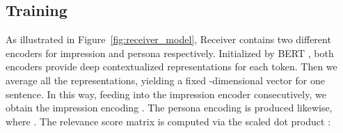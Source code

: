 \documentclass[11pt,a4paper]{article}
\begin{document}
\subsection{Training}

As illustrated in Figure~\ref{fig:receiver_model}, Receiver contains two different encoders for impression and persona respectively. Initialized by BERT \cite{devlin2018bert}, both encoders provide deep contextualized representations for each token. Then we average all the representations, yielding a fixed -dimensional vector for one sentence. In this way, feeding  into the impression encoder consecutively, we obtain the impression encoding . The persona encoding  is produced likewise, where . The relevance score matrix  is computed via the scaled dot product \cite{vaswani2017attention}:


\begin{table*}[t]
    \centering
    \caption{Automatic evaluation results of different methods on the \textsc{Persona-Chat} dataset. The standard deviation [] (across 5 runs) of  is also reported. All the results were evaluated on the dev set since the test set was not publicly available.}
    \label{tab:experiment_transmitter}
\end{table*}
\end{document}
